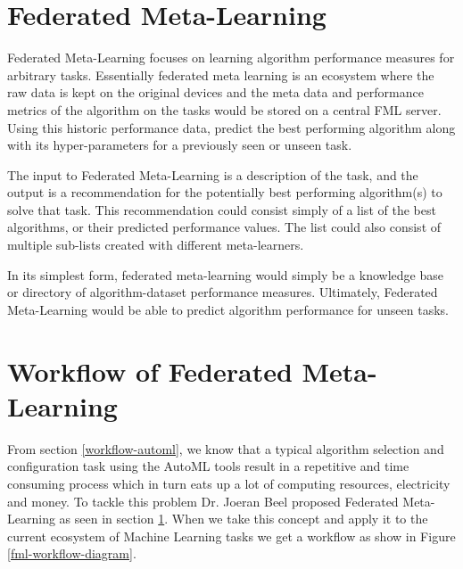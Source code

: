 

\section{Federated Meta-Learning}
\label{federated-meta-learning}
Federated Meta-Learning focuses on learning algorithm performance measures for arbitrary tasks. Essentially federated meta learning is an ecosystem where the raw data is kept on the original devices and the meta data and performance metrics of the algorithm on the tasks would be stored on a central FML server. Using this historic performance data, predict the best performing algorithm along with its hyper-parameters for a previously seen or unseen task.

The input to Federated Meta-Learning is a description of the task, and the output is a recommendation for the potentially best performing algorithm(s) to solve that task. This recommendation could consist simply of a list of the best algorithms, or their predicted performance values. The list could also consist of multiple sub-lists created with different meta-learners.

In its simplest form, federated meta-learning would simply be a knowledge base or directory of algorithm-dataset performance measures. Ultimately, Federated Meta-Learning would be able to predict algorithm performance for unseen tasks.

\section{Workflow of Federated Meta-Learning}
\label{fml-workflow}

From section \ref{workflow-automl}, we know that a typical algorithm selection and configuration task using the AutoML tools result in a repetitive and time consuming process which in turn eats up a lot of computing resources, electricity and money. To tackle this problem Dr. Joeran Beel proposed Federated Meta-Learning as seen in section \ref{federated-meta-learning}. When we take this concept and apply it to the current ecosystem of Machine Learning tasks we get a workflow as show in Figure \ref{fml-workflow-diagram}.


